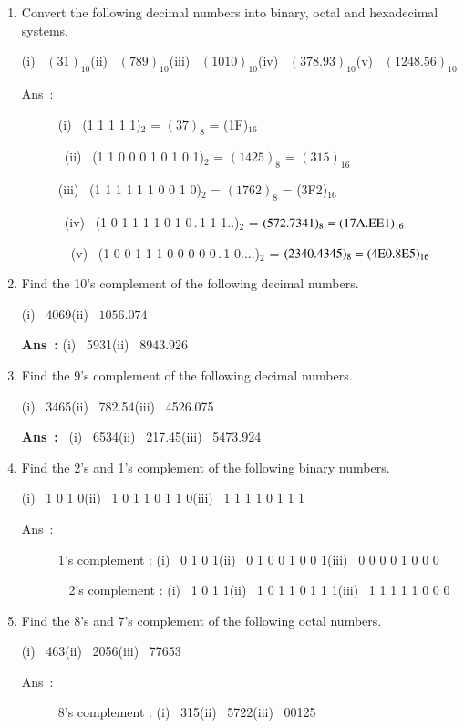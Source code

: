 \begin{enumerate}
\item Convert the following decimal numbers into binary, octal and hexadecimal systems.

\smallskip
(i)~ $(31)_{10}$\hfil (ii)~ $(789)_{10}$\hfil (iii)~ $(1010)_{10}$\hfil (iv)~ $(378.93)_{10}$\hfil (v)~ $(1248.56)_{10}$
\begin{description}
\item[Ans~:] (i)~ (1 1 1 1 1)$_{2}$ = $(37)_{8}$ = (1F)$_{16}$

~(ii)~ (1 1 0 0 0 1 0 1 0 1)$_{2}$ = $(1425)_{8}$ = $(315)_{16}$

(iii)~ (1 1 1 1 1 1 0 0 1 0)$_{2}$ = $(1762)_{8}$ = (3F2)$_{16}$

~(iv)~ (1 0 1 1 1 1 0 1 0\,.\,1 1 1..)$_{2}$ = $(572.7341)_{8}=(17\textrm{A}.\textrm{E}\textrm{E} 1)_{16}$

~~(v)~ (1 0 0 1 1 1 0 0 0 0 0\,.\,1 0....)$_{2}$ = $(2340.4345)_{8}=(4\textrm{E} 0.8\textrm{E} 5)_{16}$
\end{description}

\item Find the 10's complement of the following decimal numbers.

\smallskip
(i)~ 4069\qquad (ii)~ $1056.074$

\medskip
{\bf Ans~:} (i)~ 5931\qquad (ii)~ 8943.926

\item Find the 9's complement of the following decimal numbers.

\smallskip
(i)~ 3465\qquad (ii)~ 782.54\qquad (iii)~ 4526.075

\medskip
{\bf Ans~:}~ (i)~ 6534\qquad (ii)~ 217.45\qquad (iii)~ 5473.924

\item Find the 2's and 1's complement of the following binary numbers.

\smallskip
(i)~ 1 0 1 0\qquad (ii)~ 1 0 1 1 0 1 1 0\qquad (iii)~ 1 1 1 1 0 1 1 1\hfil
\begin{description}
\item[Ans~:] 1's complement : (i)~ 0 1 0 1\qquad (ii)~ 0 1 0 0 1 0 0 1\qquad (iii)~ 0 0 0 0 1 0 0 0

~ 2's complement : (i)~ 1 0 1 1\qquad (ii)~ 1 0 1 1 0 1 1 1\qquad (iii)~ 1 1 1 1 1 0 0 0
\end{description}

\item Find the 8's and 7's complement of the following octal numbers.

\smallskip
(i)~ 463\qquad (ii)~ 2056\qquad (iii)~ 77653\hfil
\begin{description}
\item[Ans~:] 8's complement : (i)~ 315\qquad (ii)~ 5722\qquad (iii)~ 00125


\end{description}
\end{enumerate}
